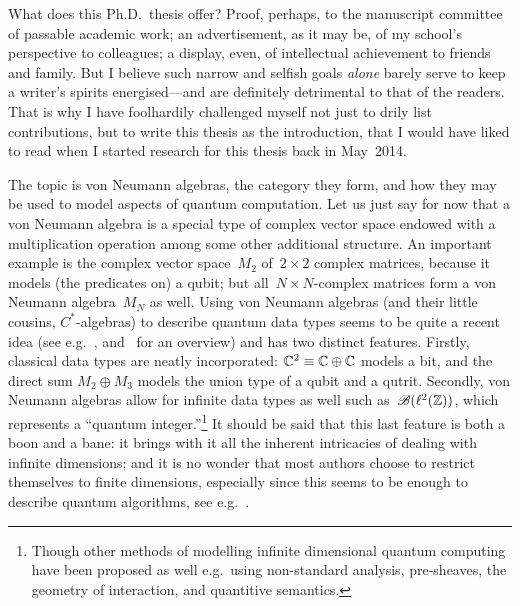 \documentclass[b5paper]{book}
\begin{document}
\begin{parsec}{10}
\begin{point}{10}
What does this Ph.D.~thesis offer?
Proof, perhaps,
to the manuscript committee
of passable academic work;
an advertisement, as it may be,
of my school's perspective
to colleagues;
a display, even,
of intellectual achievement
to friends and family.
But I believe such narrow and selfish goals \emph{alone}
barely serve to keep a writer's spirits 
energised---and are definitely detrimental to that of the readers.
That is why I have foolhardily
challenged
myself
not just 
to drily list contributions,
but to write this thesis 
as the introduction,
that I would have liked to read
when I started
research for this thesis
back in May~2014.

The topic is von Neumann algebras,
the category they form,
and how they may be used
to model aspects of quantum computation.
Let us just say for now that a von Neumann algebra
is a special type of complex vector
space endowed with
a multiplication operation among some other additional structure.
An important example is the complex vector space~$M_2$
of~$2\times 2$ complex matrices,
because it models (the predicates on) a qubit;
but all~$N\times N$-complex matrices form a von Neumann algebra~$M_N$ as well.
Using von Neumann algebras
(and their little cousins, $C^*$-algebras) 
to describe quantum data types 
seems to be quite a recent idea
(see e.g.~\cite{jacobs2013block,rennela2015operator,furber2013kleisli}, 
	and~\cite{cho2016semantics} for an overview)
and has two distinct features.
Firstly, classical data types
are neatly incorporated:
$\mathbb{C}^2 \equiv \mathbb{C}\oplus \mathbb{C}$
models a bit,
and the direct sum $M_2\oplus M_3$
models the union type of a qubit and a qutrit.
Secondly,
von Neumann algebras
allow for infinite data types as well
	such as~$\mathscr{B}(\ell^2(\mathbb{Z}))$,
which represents a ``quantum integer.''\footnote{Though
	other methods of modelling infinite dimensional
	quantum computing have been proposed as well
	e.g.~using non-standard analysis\cite{Gogioso2017},
	pre-sheaves\cite{malherbe2013categorical},
	the geometry of interaction\cite{hasuo2017semantics},
	and quantitive semantics\cite{pagani2014applying}.}
It should be said that this last feature
is both a boon and a bane:
it brings with it all the inherent
intricacies of dealing with infinite dimensions;
and it is no wonder that
most authors choose 
to restrict themselves
to finite dimensions,
especially since
this seems to be enough to describe quantum algorithms,
see e.g.~\cite{nielsen2002quantum}.
\end{point}

\end{parsec}
\end{document}
